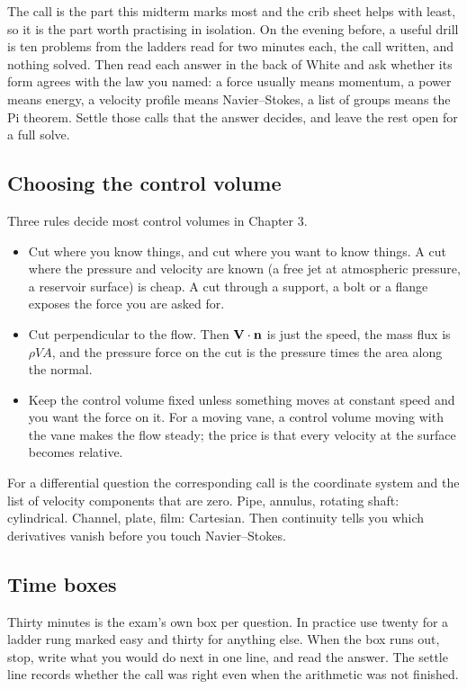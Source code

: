 The call is the part this midterm marks most and the crib sheet helps with least, so it is the part worth practising in isolation. On the evening before, a useful drill is ten problems from the ladders read for two minutes each, the call written, and nothing solved. Then read each answer in the back of White and ask whether its form agrees with the law you named: a force usually means momentum, a power means energy, a velocity profile means Navier--Stokes, a list of groups means the Pi theorem. Settle those calls that the answer decides, and leave the rest open for a full solve.

\subsection*{Choosing the control volume}

Three rules decide most control volumes in Chapter 3.

\begin{itemize}[nosep,leftmargin=*]
\item Cut where you know things, and cut where you want to know things. A cut where the pressure and velocity are known (a free jet at atmospheric pressure, a reservoir surface) is cheap. A cut through a support, a bolt or a flange exposes the force you are asked for.
\item Cut perpendicular to the flow. Then $\mathbf{V}\cdot\mathbf{n}$ is just the speed, the mass flux is $\rho V A$, and the pressure force on the cut is the pressure times the area along the normal.
\item Keep the control volume fixed unless something moves at constant speed and you want the force on it. For a moving vane, a control volume moving with the vane makes the flow steady; the price is that every velocity at the surface becomes relative.
\end{itemize}

For a differential question the corresponding call is the coordinate system and the list of velocity components that are zero. Pipe, annulus, rotating shaft: cylindrical. Channel, plate, film: Cartesian. Then continuity tells you which derivatives vanish before you touch Navier--Stokes.

\subsection*{Time boxes}

Thirty minutes is the exam's own box per question. In practice use twenty for a ladder rung marked easy and thirty for anything else. When the box runs out, stop, write what you would do next in one line, and read the answer. The settle line records whether the call was right even when the arithmetic was not finished.
